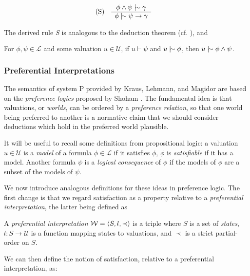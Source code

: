 \begin{align}
  \inferLeft{S}{\phi \land \psi \twiddle \gamma}{\phi \twiddle \psi \rightarrow \gamma}
\end{align}

The derived rule \textit{S} is analogous to the deduction theorem (cf. ), and

\begin{lemma}
  For $\phi, \psi \in \mathcal{L}$ and some valuation $u \in \mathcal{U}$, if $u \vdash \psi$ and $u \twiddle \phi$, then $u \twiddle \phi \land
  \psi$.
\end{lemma}

\subsubsection{Preferential Interpretations}
\label{subsubsection:preferential-interpretations}

The semantics of system P provided by Kraus, Lehmann, and Magidor \cite{kraus1990nonmonotonic} are based on the \textit{preference logics} proposed
by Shoham \cite{shohamSemanticApproach}. The fundamental idea is that valuations, or \textit{worlds}, can be ordered by a \textit{preference
relation}, so that one world being preferred to another is a normative claim that we should consider deductions which hold in the preferred world
plausible.

It will be useful to recall some definitions from propositional logic: a valuation $u \in \mathcal{U}$ is a \textit{model} of a formula $\phi
\in \mathcal{L}$ if it satisfies $\phi$, $\phi$ is \textit{satisfiable} if it has a model. Another formula $\psi$ is a \textit{logical
consequence} of $\phi$ if the models of $\phi$ are a subset of the models of $\psi$.

We now introduce analogous definitions for these ideas in preference logic. The first change is that we regard satisfaction as a property
relative to a \textit{preferential interpretation}, the latter being defined as

\begin{definition}
  \label{definition:preferential-interpretation} A \emph{preferential interpretation} $\mathcal{W} = \langle S,l,\prec \rangle$ is a triple where $S$ is a set of \emph{states},
  $l: S \to \mathcal{U}$ is a function mapping states to valuations, and $\prec$ is a strict partial-order on $S$.
\end{definition}

We can then define the notion of satisfaction, relative to a preferential interpretation, as:

